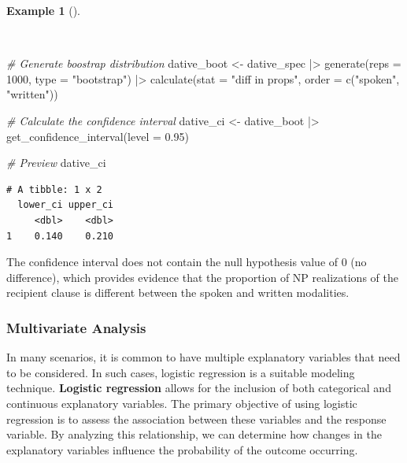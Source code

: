 \documentclass[
  letterpaper,
]{book}
\newenvironment{Shaded}{\begin{snugshade}}{\end{snugshade}}
\newcommand{\AttributeTok}[1]{\textcolor[rgb]{0.00,0.00,0.00}{#1}}
\newcommand{\CommentTok}[1]{\textcolor[rgb]{0.00,0.00,0.00}{\textit{#1}}}
\newcommand{\DecValTok}[1]{\textcolor[rgb]{0.00,0.00,0.00}{#1}}
\newcommand{\FloatTok}[1]{\textcolor[rgb]{0.00,0.00,0.00}{#1}}
\newcommand{\FunctionTok}[1]{\textcolor[rgb]{0.00,0.00,0.00}{#1}}
\newcommand{\NormalTok}[1]{\textcolor[rgb]{0.00,0.00,0.00}{#1}}
\newcommand{\OtherTok}[1]{\textcolor[rgb]{0.00,0.00,0.00}{#1}}
\newcommand{\SpecialCharTok}[1]{\textcolor[rgb]{0.00,0.00,0.00}{#1}}
\newcommand{\StringTok}[1]{\textcolor[rgb]{0.00,0.00,0.00}{#1}}
\theoremstyle{definition}
\newtheorem{example}{Example}[chapter]
\theoremstyle{remark}
\begin{document}
\begin{example}[]\protect\hypertarget{exm-infer-cat-confidence-interval-bivariate}{}\label{exm-infer-cat-confidence-interval-bivariate}

~

\begin{Shaded}
\begin{Highlighting}[]
\CommentTok{\# Generate boostrap distribution}
\NormalTok{dative\_boot }\OtherTok{\textless{}{-}}
\NormalTok{  dative\_spec }\SpecialCharTok{|\textgreater{}}
  \FunctionTok{generate}\NormalTok{(}\AttributeTok{reps =} \DecValTok{1000}\NormalTok{, }\AttributeTok{type =} \StringTok{"bootstrap"}\NormalTok{) }\SpecialCharTok{|\textgreater{}}
  \FunctionTok{calculate}\NormalTok{(}\AttributeTok{stat =} \StringTok{"diff in props"}\NormalTok{, }\AttributeTok{order =} \FunctionTok{c}\NormalTok{(}\StringTok{"spoken"}\NormalTok{, }\StringTok{"written"}\NormalTok{))}

\CommentTok{\# Calculate the confidence interval}
\NormalTok{dative\_ci }\OtherTok{\textless{}{-}}
\NormalTok{  dative\_boot }\SpecialCharTok{|\textgreater{}}
  \FunctionTok{get\_confidence\_interval}\NormalTok{(}\AttributeTok{level =} \FloatTok{0.95}\NormalTok{)}

\CommentTok{\# Preview}
\NormalTok{dative\_ci}
\end{Highlighting}
\end{Shaded}

\begin{verbatim}
# A tibble: 1 x 2
  lower_ci upper_ci
     <dbl>    <dbl>
1    0.140    0.210
\end{verbatim}

\end{example}

The confidence interval does not contain the null hypothesis value of 0
(no difference), which provides evidence that the proportion of NP
realizations of the recipient clause is different between the spoken and
written modalities.

\subsubsection{Multivariate Analysis}\label{multivariate-analysis}

In many scenarios, it is common to have multiple explanatory variables
that need to be considered. In such cases, logistic regression is a
suitable modeling technique. \textbf{Logistic regression} allows for the
inclusion of both categorical and continuous explanatory variables. The
primary objective of using logistic regression is to assess the
association between these variables and the response variable. By
analyzing this relationship, we can determine how changes in the
explanatory variables influence the probability of the outcome
occurring.
\end{document}
